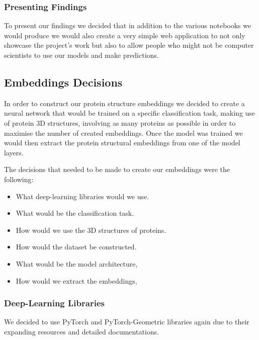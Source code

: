 \subsubsection{Presenting Findings}
\label{subsubsec:Presenting_Findings}

To present our findings we decided that in addition to the various notebooks we would produce we would also create a very simple \citet{Streamlit} web application to not only showcase the project's work but also to allow people who might not be computer scientists to use our models and make predictions.

\subsection{Embeddings Decisions}

In order to construct our protein structure embeddings we decided to create a neural network that would be trained on a specific classification task, making use of protein 3D structures, involving as many proteins as possible in order to maximise the number of created embeddings. Once the model was trained we would then extract the protein structural embeddings from one of the model layers.

The decisions that needed to be made to create our embeddings were the following:

\hspace{1cm}

\begin{itemize}
    \itemsep0em 
    \item
    What deep-learning libraries would we use.
    \item
    What would be the classification task.
    \item
    How would we use the 3D structures of proteins.
    \item
    How would the dataset be constructed.
    \item
    What would be the model architecture,
    \item
    How would we extract the embeddings,
\end{itemize}

\subsubsection{Deep-Learning Libraries}

We decided to use PyTorch \citep{NEURIPS2019_9015} and PyTorch-Geometric \citep{PyTorch_Geometric} libraries again due to their expanding resources and detailed documentations.

